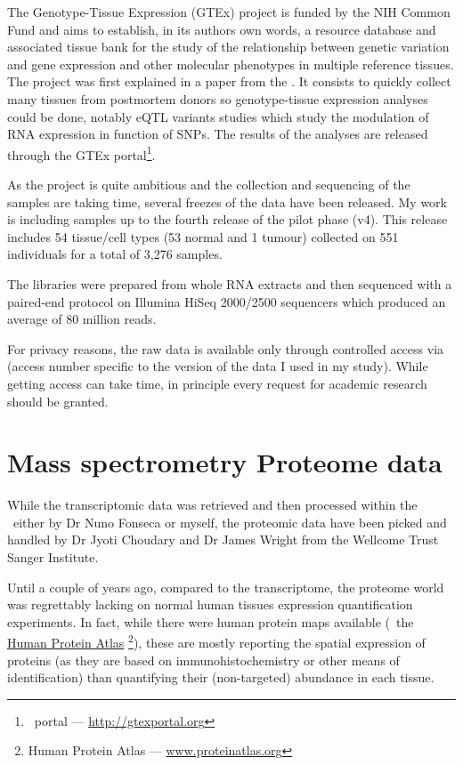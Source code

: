 The Genotype-Tissue Expression (\gls{GTEx}) project is funded by the \gls{NIH}
Common Fund and aims to establish, in its authors own words,
a resource database and associated tissue bank
for the study of the relationship between genetic variation and gene expression
and other molecular phenotypes in multiple reference tissues. The project was first
explained in a paper from the \cite{GTEx2013}. It consists to quickly collect
many tissues from postmortem donors so genotype-tissue expression analyses could
be done, notably \gls{eQTL} variants studies which study the modulation
of \gls{RNA} expression in function of \glspl{SNP}. The results of the
analyses are released through the GTEx portal\footnote{\Gtex\ portal --- %
\href{http://gtexportal.org}{http://gtexportal.org}}.

As the project is quite ambitious and the collection and sequencing of the samples
are taking time, several freezes of the data have been released. My work is
including samples up to the fourth release of the pilot phase (v4). This
release includes 54 tissue/cell types (53 normal and 1 tumour)
collected on 551 individuals for a total of 3,276 samples.

The libraries were prepared from whole \gls{RNA} extracts and then sequenced
with a paired-end protocol on Illumina HiSeq 2000/2500 sequencers which produced
an average of 80 million reads.

For privacy reasons, the raw data is available only through controlled access via
 (access number specific to the version of the data I used
in my study). While getting access can take time, in principle every request for
academic research should be granted.

\section{Mass spectrometry Proteome data}

While the transcriptomic data was retrieved and then processed within the \EBI\
either by Dr Nuno Fonseca or myself, the proteomic data have been picked and
handled by Dr Jyoti Choudary and Dr James Wright from the Wellcome Trust
Sanger Institute.

Until a couple of years ago, compared to the transcriptome, the proteome world
was regrettably lacking on normal human tissues expression quantification
experiments. In fact, while there were human protein maps available
(\eg\ the \href{www.proteinatlas}{Human Protein Atlas}%
\footnote{Human Protein Atlas --- \href{http://www.proteinatlas.org}%
{www.proteinatlas.org}}), these
are mostly reporting the spatial expression of proteins (as they are based
on immunohistochemistry or other means of identification) than quantifying
their (non-targeted) abundance in each tissue.

